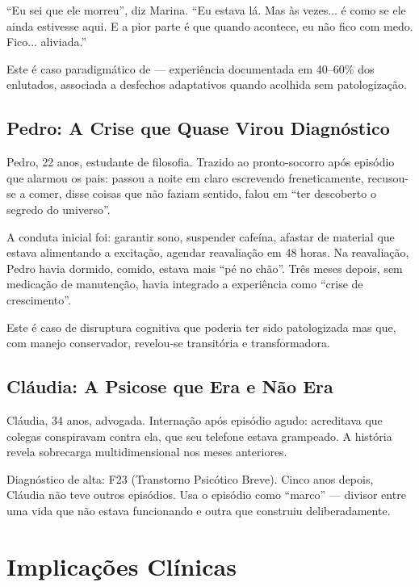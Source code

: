 \enquote{Eu sei que ele morreu}, diz Marina. \enquote{Eu estava lá. Mas às vezes... é como se ele ainda estivesse aqui. E a pior parte é que quando acontece, eu não fico com medo. Fico... aliviada.}

Este é caso paradigmático de  --- experiência documentada em 40--60\% dos enlutados, associada a desfechos adaptativos quando acolhida sem patologização.

\subsection{Pedro: A Crise que Quase Virou Diagnóstico}

Pedro, 22 anos, estudante de filosofia. Trazido ao pronto-socorro após episódio que alarmou os pais: passou a noite em claro escrevendo freneticamente, recusou-se a comer, disse coisas que não faziam sentido, falou em \enquote{ter descoberto o segredo do universo}.

A conduta inicial foi: garantir sono, suspender cafeína, afastar de material que estava alimentando a excitação, agendar reavaliação em 48 horas. Na reavaliação, Pedro havia dormido, comido, estava mais \enquote{pé no chão}. Três meses depois, sem medicação de manutenção, havia integrado a experiência como \enquote{crise de crescimento}.

Este é caso de disruptura cognitiva que poderia ter sido patologizada mas que, com manejo conservador, revelou-se transitória e transformadora.

\subsection{Cláudia: A Psicose que Era e Não Era}

Cláudia, 34 anos, advogada. Internação após episódio agudo: acreditava que colegas conspiravam contra ela, que seu telefone estava grampeado. A história revela sobrecarga multidimensional nos meses anteriores.

Diagnóstico de alta: F23 (Transtorno Psicótico Breve). Cinco anos depois, Cláudia não teve outros episódios. Usa o episódio como \enquote{marco} --- divisor entre uma vida que não estava funcionando e outra que construiu deliberadamente.

\section{Implicações Clínicas}
\label{sec:implicacoes-disruptura}


